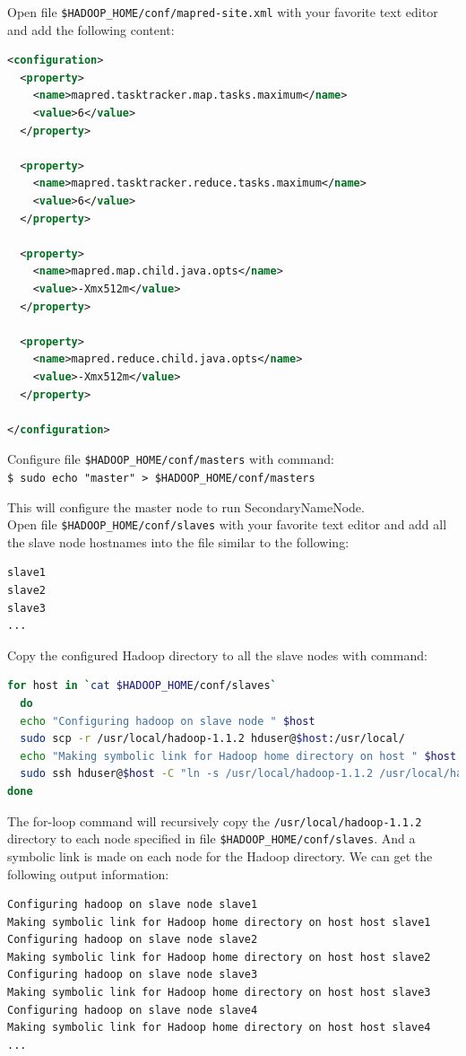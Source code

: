 Open file \verb|$HADOOP_HOME/conf/mapred-site.xml| with your favorite text editor and add the following content:
\lstset{style=bashstyle}
\begin{lstlisting}[language=XML]
<configuration>
  <property>
    <name>mapred.tasktracker.map.tasks.maximum</name>
    <value>6</value>
  </property>

  <property>
    <name>mapred.tasktracker.reduce.tasks.maximum</name>
    <value>6</value>
  </property>

  <property>
    <name>mapred.map.child.java.opts</name>
    <value>-Xmx512m</value>
  </property>

  <property>
    <name>mapred.reduce.child.java.opts</name>
    <value>-Xmx512m</value>
  </property>

</configuration>
\end{lstlisting}

Configure file \verb|$HADOOP_HOME/conf/masters| with command: \\
\verb|$ sudo echo "master" > $HADOOP_HOME/conf/masters|

This will configure the master node to run SecondaryNameNode. \\
Open file \verb|$HADOOP_HOME/conf/slaves| with your favorite text editor and add all the slave node hostnames into the file similar to the following:
\lstset{style=bashstyle}
\begin{lstlisting}
slave1
slave2
slave3
...
\end{lstlisting}

Copy the configured Hadoop directory to all the slave nodes with command:
\lstset{style=bashstyle}
\begin{lstlisting}[language=bash]
for host in `cat $HADOOP_HOME/conf/slaves`
  do
  echo "Configuring hadoop on slave node " $host
  sudo scp -r /usr/local/hadoop-1.1.2 hduser@$host:/usr/local/
  echo "Making symbolic link for Hadoop home directory on host " $host
  sudo ssh hduser@$host -C "ln -s /usr/local/hadoop-1.1.2 /usr/local/hadoop"
done
\end{lstlisting}

The for-loop command will recursively copy the \verb|/usr/local/hadoop-1.1.2| directory to each node specified in file \verb|$HADOOP_HOME/conf/slaves|. And a symbolic link is made on each node for the Hadoop directory. We can get the following output information:
\lstset{style=bashstyle}
\begin{lstlisting}
Configuring hadoop on slave node slave1
Making symbolic link for Hadoop home directory on host host slave1
Configuring hadoop on slave node slave2
Making symbolic link for Hadoop home directory on host host slave2
Configuring hadoop on slave node slave3
Making symbolic link for Hadoop home directory on host host slave3
Configuring hadoop on slave node slave4
Making symbolic link for Hadoop home directory on host host slave4
...
\end{lstlisting}

